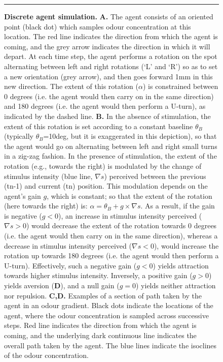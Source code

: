 \documentclass[11pt,a4paper]{article}
\begin{document}
\begin{figure}[ht!]
\begin{center}
\caption{
{\bf Discrete agent simulation.}
{\bf A.} The agent consists of an oriented point (black dot) which samples odour concentration at this location. The red line indicates the direction from which the agent is coming, and the grey arrow indicates the direction in which it will depart. At each time step, the agent performs a rotation on the spot alternating between left and right rotations (`L' and `R') so as to set a new orientation (grey arrow), and then goes forward 1mm in this new direction. The extent of this rotation ($\alpha$) is constrained between 0 degrees (i.e. the agent would then carry on in the same direction) and 180 degrees (i.e. the agent would then perform a U-turn), as indicated by the dashed line.
{\bf B.} In the absence of stimulation, the extent of this rotation is set according to a constant baseline $\theta_{B}$ (typically $\theta_{B}$=10deg, but it is exaggerated in this depiction), so that the agent would go on alternating between left and right small turns in a zig-zag fashion.
 In the presence of stimulation, the extent of the rotation (e.g., towards the right) is modulated by the change of stimulus intensity (blue line, $\nabla s$) perceived between the previous (tn-1) and current (tn) position. This modulation depends on the agent's gain $g$, which is constant; so that the extent of the rotation (here towards the right) is: $\alpha=\theta_{B}+g\times\nabla s$.
 As a result, if the gain is negative ($g<0$), an increase in stimulus intensity perceived ($\nabla s>0$) would decrease the extent of the rotation towards 0 degrees (i.e. the agent would then carry on in the same direction), whereas a decrease in stimulus intensity perceived ($\nabla s<0$), would increase the rotation up towards 180 degrees (i.e. the agent would then perform a U-turn). Effectively, such a negative gain ($g<0$) yields attraction towards higher stimulus intensity. Inversely, a positive gain ($g>0$) yields aversion ({\bf D}), and a null gain ($g=0$) yields neither attraction nor repulsion.
{\bf C,D.} Examples of a section of path taken by the agent in an odour gradient. Black dots indicate the locations of the agent, where the odour concentration is sampled across successive steps. Red line indicates the direction from which the agent is coming, and the underlying dark continuous line indicates the overall path taken by the agent. The blue lines indicate the isoclines of the odour concentration.
 \label{fig:MethodAgent}
}
\end{center}
\hrule
\end{figure}
\end{document}
